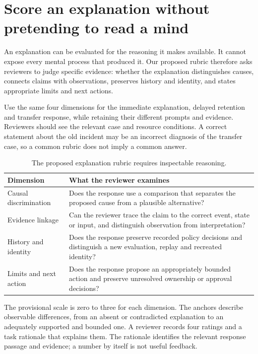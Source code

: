\section{Score an explanation without pretending to read a mind}\label{sec:ch13-rubric}

An explanation can be evaluated for the reasoning it makes available. It cannot expose every mental process that produced it. Our proposed rubric therefore asks reviewers to judge specific evidence: whether the explanation distinguishes causes, connects claims with observations, preserves history and identity, and states appropriate limits and next actions.

Use the same four dimensions for the immediate explanation, delayed retention and transfer response, while retaining their different prompts and evidence. Reviewers should see the relevant case and resource conditions. A correct statement about the old incident may be an incorrect diagnosis of the transfer case, so a common rubric does not imply a common answer.

\begin{table}[H]\centering\small
\caption{The proposed explanation rubric requires inspectable reasoning.}\label{tab:ch13-rubric}
\begin{tabularx}{\textwidth}{@{}p{}X@{}}\toprule
\textbf{Dimension} & \textbf{What the reviewer examines}\\\midrule
Causal discrimination & Does the response use a comparison that separates the proposed cause from a plausible alternative?\\
Evidence linkage & Can the reviewer trace the claim to the correct event, state or input, and distinguish observation from interpretation?\\
History and identity & Does the response preserve recorded policy decisions and distinguish a new evaluation, replay and recreated identity?\\
Limits and next action & Does the response propose an appropriately bounded action and preserve unresolved ownership or approval decisions?\\\bottomrule
\end{tabularx}
\end{table}

The provisional scale is zero to three for each dimension. The anchors describe observable differences, from an absent or contradicted explanation to an adequately supported and bounded one. A reviewer records four ratings and a task rationale that explains them. The rationale identifies the relevant response passage and evidence; a number by itself is not useful feedback.

